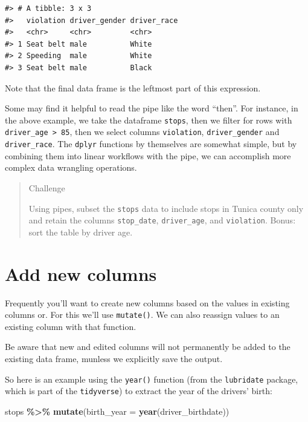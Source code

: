 \documentclass[
]{book}
\newenvironment{Shaded}{\begin{snugshade}}{\end{snugshade}}
\newcommand{\AttributeTok}[1]{\textcolor[rgb]{0.13,0.29,0.53}{#1}}
\newcommand{\FunctionTok}[1]{\textcolor[rgb]{0.13,0.29,0.53}{\textbf{#1}}}
\newcommand{\NormalTok}[1]{#1}
\newcommand{\SpecialCharTok}[1]{\textcolor[rgb]{0.81,0.36,0.00}{\textbf{#1}}}
\begin{document}
\begin{verbatim}
#> # A tibble: 3 x 3
#>   violation driver_gender driver_race
#>   <chr>     <chr>         <chr>      
#> 1 Seat belt male          White      
#> 2 Speeding  male          White      
#> 3 Seat belt male          Black
\end{verbatim}

Note that the final data frame is the leftmost part of this expression.

Some may find it helpful to read the pipe like the word ``then''. For instance, in the above example, we take the dataframe \texttt{stops}, then we filter for rows with \texttt{driver\_age\ \textgreater{}\ 85}, then we select columns \texttt{violation}, \texttt{driver\_gender} and \texttt{driver\_race}. The \texttt{dplyr} functions by themselves are somewhat simple, but by combining them into linear workflows with the pipe, we can accomplish more complex data wrangling operations.

\begin{quote}
Challenge

Using pipes, subset the \texttt{stops} data to include stops in Tunica county only and retain the columns \texttt{stop\_date}, \texttt{driver\_age}, and \texttt{violation}. Bonus: sort the table by driver age.
\end{quote}

\hypertarget{add-new-columns}{%
\section{Add new columns}\label{add-new-columns}}

Frequently you'll want to create new columns based on the values in existing columns or. For this we'll use \texttt{mutate()}. We can also reassign values to an existing column with that function.

Be aware that new and edited columns will not permanently be added to the existing data frame, munless we explicitly save the output.

So here is an example using the \texttt{year()} function (from the \texttt{lubridate} package, which is part of the \texttt{tidyverse}) to extract the year of the drivers' birth:

\begin{Shaded}
\begin{Highlighting}[]
\NormalTok{stops }\SpecialCharTok{\%\textgreater{}\%} 
  \FunctionTok{mutate}\NormalTok{(}\AttributeTok{birth\_year =} \FunctionTok{year}\NormalTok{(driver\_birthdate))}
\end{Highlighting}
\end{Shaded}
\end{document}
